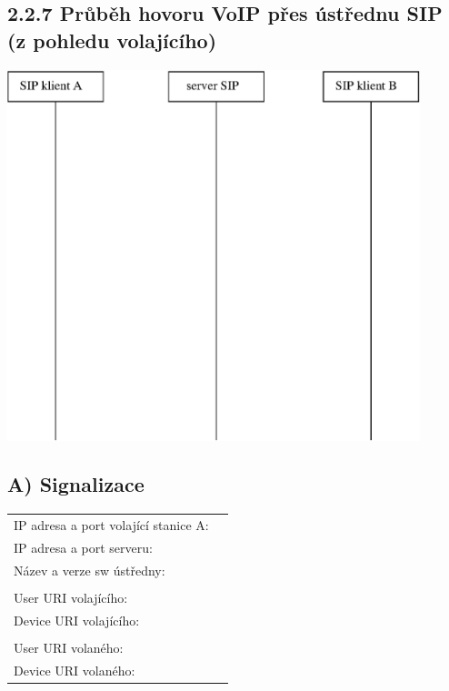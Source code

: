 \documentclass[a4paper,11pt]{article}
\begin{document}
\subsection*{2.2.7 Průběh hovoru VoIP přes ústřednu SIP (z pohledu volajícího)}
  \begin{center}    
    \includegraphics[width=120mm]{img/pres-ustrednu.eps}
  \end{center}
  \vspace{1cm}

  \subsection*{A) Signalizace}
  \begin{tabular}{lp{2cm}}
    IP adresa a port volající stanice A: &\\
    IP adresa a port serveru: &\\
    Název a verze sw ústředny: &\\
    &\\
    User URI volajícího: &\\
    Device URI volajícího: &\\
    &\\
    User URI volaného: &\\
    Device URI volaného: &\\
  \end{tabular}               
\end{document}
